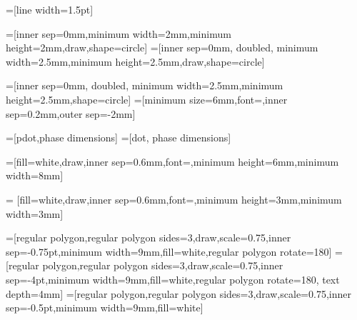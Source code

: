 

=[line width=1.5pt] %


=[inner sep=0mm,minimum width=2mm,minimum height=2mm,draw,shape=circle]  
=[inner sep=0mm, doubled, minimum width=2.5mm,minimum height=2.5mm,draw,shape=circle]

=[inner sep=0mm, doubled, minimum width=2.5mm,minimum height=2.5mm,shape=circle]
=[minimum size=6mm,font=\footnotesize,inner sep=0.2mm,outer sep=-2mm]

=[pdot,phase dimensions]
=[dot, phase dimensions]


=[fill=white,draw,inner sep=0.6mm,font=\footnotesize,minimum height=6mm,minimum width=8mm]


 = [fill=white,draw,inner sep=0.6mm,font=\footnotesize,minimum height=3mm,minimum width=3mm]


=[regular polygon,regular polygon sides=3,draw,scale=0.75,inner sep=-0.75pt,minimum width=9mm,fill=white,regular polygon rotate=180]
=[regular polygon,regular polygon sides=3,draw,scale=0.75,inner sep=-4pt,minimum width=9mm,fill=white,regular polygon rotate=180, text depth=4mm]
=[regular polygon,regular polygon sides=3,draw,scale=0.75,inner sep=-0.5pt,minimum width=9mm,fill=white]


\makeatletter
\newcommand{\boxshape}[3]{%
\pgfdeclareshape{#1}{
\inheritsavedanchors[from=rectangle] %
\inheritanchorborder[from=rectangle]
\inheritanchor[from=rectangle]{center}
\inheritanchor[from=rectangle]{north}
\inheritanchor[from=rectangle]{south}
\inheritanchor[from=rectangle]{west}
\inheritanchor[from=rectangle]{east}
\backgroundpath{%
\southwest \pgf@xa=\pgf@x \pgf@ya=\pgf@y
\northeast \pgf@xb=\pgf@x \pgf@yb=\pgf@y

\@tempdima=#2
\@tempdimb=#3

\pgfpathmoveto{\pgfpoint{\pgf@xa - 5pt + \@tempdima}{\pgf@ya}}
\pgfpathlineto{\pgfpoint{\pgf@xa - 5pt - \@tempdima}{\pgf@yb}}
\pgfpathlineto{\pgfpoint{\pgf@xb + 5pt + \@tempdimb}{\pgf@yb}}
\pgfpathlineto{\pgfpoint{\pgf@xb + 5pt - \@tempdimb}{\pgf@ya}}
\pgfpathlineto{\pgfpoint{\pgf@xa - 5pt + \@tempdima}{\pgf@ya}}
\pgfpathclose
}
}}

